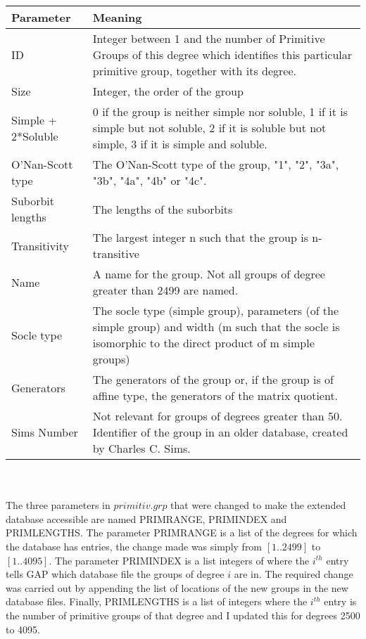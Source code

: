 \documentclass[]{article}
\theoremstyle{definition}
\begin{document}
\begin{tabular}{|l| p{8cm}|}
	\hline Parameter & Meaning \\
	\hline ID & Integer between 1 and the number of Primitive Groups of this degree which identifies this particular primitive group, together with its degree. \\ 
	\hline Size & Integer, the order of the group \\ 
	\hline Simple + 2*Soluble & 0 if the group is neither simple nor soluble, 1 if it is simple but not soluble, 2 if it is soluble but not simple, 3 if it is simple and soluble. \\ 
	\hline O'Nan-Scott type & The O'Nan-Scott type of the group, "1", "2", "3a", "3b", "4a", "4b" or "4c". \\ 
	\hline Suborbit lengths & The lengths of the suborbits \\ 
	\hline Transitivity &  The largest integer n such that the group is n-transitive\\ 
	\hline Name & A name for the group. Not all groups of degree greater than 2499 are named. \\ 
	\hline Socle type & The socle type (simple group), parameters (of the simple group) and width (m such that the socle is isomorphic to the direct product of m simple groups) \\ 
	\hline Generators &  The generators of the group or, if the group is of affine type, the generators of the matrix quotient. \\ 
	\hline Sims Number & Not relevant for groups of degrees greater than 50. Identifier of the group in an older database, created by Charles C. Sims. \\ 
	\hline 
\end{tabular} 
\\
\\

The three parameters in $primitiv.grp$ that were changed to make the extended database accessible are named PRIMRANGE, PRIMINDEX and PRIMLENGTHS. The parameter PRIMRANGE is a list of the degrees for which the database has entries, the change made was simply from $[1..2499]$ to $[1..4095]$. The parameter PRIMINDEX is a list integers of where the $i^{th}$ entry tells GAP which database file the groups of degree $i$ are in. The required change was carried out by appending the list of locations of the new groups in the new database files. Finally, PRIMLENGTHS is a list of integers where the $i^{th}$ entry is the number of primitive groups of that degree and I updated this for degrees 2500 to 4095.
\end{document}
